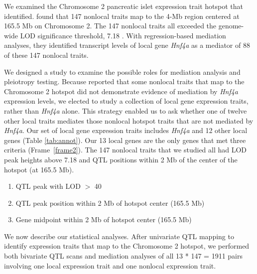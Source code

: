 \documentclass[oneside]{book}\usepackage[]{graphicx}\usepackage[]{color}
\newenvironment{frameenv}[1]
    {\begin{myfloat}[tb]
    \begin{mdframed}[roundcorner=10pt,backgroundcolor=blue!10]
    \caption{#1}
    }
    {%
    \end{mdframed}\end{myfloat}
    }
\begin{document}
\begin{titlepage}
We examined the Chromosome 2 pancreatic islet expression trait hotspot that \citet{keller2018genetic} identified.
\citet{keller2018genetic} found that 147 nonlocal traits map to the 4-Mb region
centered at 165.5 Mb on Chromosome 2.
The 147 nonlocal traits all exceeded the genome-wide LOD significance threshold,
7.18 \citep{keller2018genetic}.
With regression-based mediation analyses, they identified transcript levels of local gene \emph{Hnf4a} as a mediator of 88 of these 147 nonlocal traits.

We designed a study to examine the possible roles for mediation analysis and pleiotropy testing.
Because \citet{keller2018genetic} reported that some nonlocal traits that map to
the Chromosome 2 hotspot did not demonstrate evidence of mediation by \emph{Hnf4a} expression
levels, we elected to study a collection of local gene expression traits,
rather than \emph{Hnf4a} alone.
This strategy enabled us to ask whether one of twelve other local traits mediates those
nonlocal hotspot traits that are not mediated by \emph{Hnf4a}.
Our set of local gene expression traits includes \emph{Hnf4a} and 12
other local genes (Table \ref{tab:annot}).
Our 13 local genes are the only genes that met three criteria (Frame~\ref{frame2}).
The 147 nonlocal traits that we studied all had LOD peak heights above 7.18 and QTL positions within 2 Mb of the center of the hotspot (at 165.5 Mb).



\begin{frameenv}{Local gene inclusion criteria}\label{frame2}
\begin{enumerate}
    \item QTL peak with LOD $>$ 40
    \item QTL peak position within 2 Mb of hotspot center (165.5 Mb)
    \item Gene midpoint within 2 Mb of hotspot center (165.5 Mb)
\end{enumerate}
\end{frameenv}




We now describe our statistical analyses.
After univariate QTL mapping to identify expression traits that
map to the Chromosome 2 hotspot,
we performed both bivariate QTL scans and mediation analyses of all 13 * 147 = 1911 pairs
involving one local expression trait and one nonlocal expression trait.




\end{titlepage}
\end{document}
